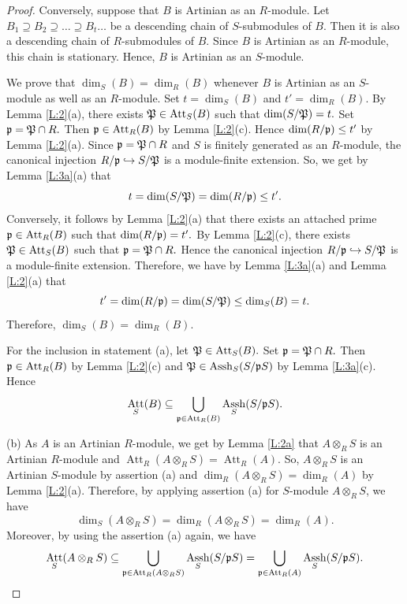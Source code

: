 \documentclass[a4papersize]{article}
\DeclareMathOperator{\Assh}{Assh}
\DeclareMathOperator{\Att}{Att}
\begin{document}
{\begin{proof}
Conversely, suppose that $B$ is Artinian as an $R$-module. Let $B_1\supseteq B_2\supseteq\ldots\supseteq B_t\ldots$ be a descending chain of $S$-submodules of $B.$ Then it is also a descending chain of $R$-submodules of $B.$ Since $B$ is Artinian as an $R$-module, this chain is stationary. Hence, $B$ is Artinian as an $S$-module.  
		
We prove that $\dim_S(B)=\dim_R(B)$ whenever $B$ is  Artinian as an $S$-module as well as an $R$-module. Set  $t=\dim_S(B)$ and $t'=\dim_R(B)$.	By Lemma \ref{L:2}(a), there exists  $\frak P\in\Att_{S}(B)$ such that $\dim(S/\frak P)=t.$ Set $\frak p =\frak P\cap R.$ Then $\frak p\in \Att_R(B)$ by Lemma \ref{L:2}(c).  Hence $\dim(R/\frak p)\leq t'$ by Lemma \ref{L:2}(a). Since $\frak p =\frak P\cap R$ and $S$ is finitely generated as an $R$-module, the canonical injection $R/\frak p\hookrightarrow S/\frak P$ is a module-finite extension. So, we get by Lemma \ref{L:3a}(a) that 
$$t=\dim(S/\frak P)=\dim(R/\frak p)\leq t'.$$
Conversely, it follows by Lemma \ref{L:2}(a) that there exists  an attached  prime $\frak p\in\Att_R(B)$ such that $\dim(R/\frak p)=t'.$ By Lemma \ref{L:2}(c), there exists  $\frak P\in\Att_S(B)$ such that $\frak p=\frak P\cap R.$ Hence the canonical injection $R/\frak p\hookrightarrow S/\frak P$ is a module-finite extension. Therefore,  we have by Lemma \ref{L:3a}(a) and Lemma \ref{L:2}(a) that  
$$t'=\dim(R/\frak p)=\dim(S/\frak P)\leq \dim_S(B)=t.$$
Therefore, $\dim_S(B)=\dim_R(B)$. 
			 
For the inclusion in statement (a), let $\frak P\in\Att_S(B).$ Set $\frak p=\frak P\cap R.$ Then $\frak p\in\Att_R(B)$ by Lemma \ref{L:2}(c) and  $\frak P\in\Assh_S(S/\frak pS)$  by Lemma \ref{L:3a}(c). Hence $$\Att_S(B)\subseteq\bigcup_{\frak p\in\Att_R(B)}\Assh_S(S/\frak pS).$$
		
	
(b) As $A$ is an Artinian $R$-module, we get by Lemma \ref{L:2a} that $A\otimes_RS$ is an Artinian $R$-module and $\Att_R(A\otimes_RS)=\Att_R(A)$. So, $A\otimes_RS$ is an Artinian $S$-module by assertion (a) and  $\dim_R(A\otimes_RS)=\dim_R(A)$  by Lemma \ref{L:2}(a).  Therefore, by applying assertion (a) for $S$-module $A\otimes_RS$, we have  $$\dim_S(A\otimes_RS)=\dim_R(A\otimes_RS)=\dim_R(A).$$ Moreover, by using the assertion (a)  again, we have
$$\Att_S(A\otimes_RS)\subseteq\bigcup_{\frak p\in\Att_R(A\otimes_RS)}\Assh_S(S/\frak pS)=\bigcup_{\frak p\in\Att_R(A)}\Assh_S(S/\frak pS).$$
	

\end{proof}}
\end{document}
